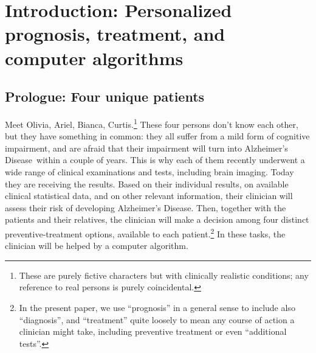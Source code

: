 \documentclass[utf8]{FrontiersinHarvard_mod} %
\renewcommand*{\|}[1][]{\nonscript\:#1\vert\nonscript\:\mathopen{}}
\newcommand*{\ad}{Alzheimer's Disease}
\begin{document}
\newpage
\section{Introduction: Personalized prognosis, treatment, and computer algorithms}
\label{sec:intro}

\setcounter{subsection}{-1}
\subsection{Prologue: Four unique patients} %
\label{sec:four_patients}

Meet Olivia, Ariel, Bianca, Curtis.\footnote{These are purely fictive characters but with clinically realistic conditions; any reference to real persons is purely coincidental.}
These four persons don't know each other, but they have something in common: they all suffer from a mild form of cognitive impairment, and are afraid that their impairment will turn into \ad\ within a couple of years. This is why each of them recently underwent a wide range of clinical examinations and tests, including brain imaging. %
Today they are receiving the results. Based on their individual results, on available clinical statistical data, and on other relevant information, their clinician will 
assess their risk of developing \ad. Then, together with the patients and their relatives, the clinician will make a decision among four distinct preventive-treatment options, available to each patient.\footnote{\label{fn:treatment}In the present paper, we use \enquote{prognosis} in a general sense to include also \enquote{diagnosis}, and \enquote{treatment} quite loosely to mean any course of action a clinician might take, including preventive treatment or even \enquote{additional tests}.} In these tasks, the clinician will be helped by a computer algorithm.
\end{document}
